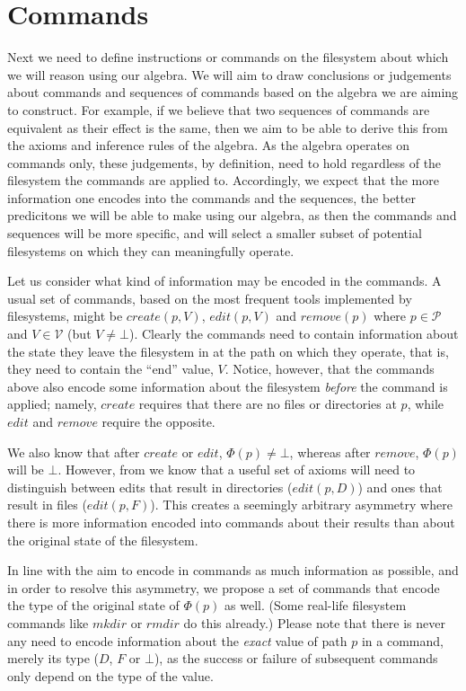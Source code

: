 \documentclass[12pt]{article}
\newcommand{\setv}{\mathcal{V}}
\newcommand{\setp}{\mathcal{P}}
\newcommand{\empt}{\bot}
\newcommand{\FS}{\Phi} %
\begin{document}
\section{Commands}

Next we need to define instructions or commands on the filesystem about which we will reason
using our algebra.
We will aim to draw conclusions or judgements about commands and sequences of commands
based on the algebra we are aiming to construct.
For example, if we believe that two sequences of commands are equivalent as their effect
is the same, then we aim to be able to derive this from the axioms and inference rules of the
algebra.
As the algebra operates on commands only,
these judgements, by definition, need to hold regardless of the filesystem the commands are applied to.
Accordingly, we expect that the more information one encodes into the commands and the sequences,
the better predicitons we will be able to make using our algebra,
as then the commands and sequences will be more specific, and will select a smaller subset
of potential filesystems on which they can meaningfully operate.

Let us consider what kind of information may be encoded in the commands.
A usual set of commands, based on the most frequent tools implemented by filesystems,
might be $create(p,V)$, $edit(p,V)$ and $remove(p)$ where $p\in\setp$ and $V\in\setv$ (but $V\neq\empt$).
Clearly the commands need to contain information about the state they leave the filesystem
in at the path on which they operate, that is, they need to contain the ``end'' value, $V$.
Notice, however, that the commands above also encode some information about the filesystem
{\it before} the command is applied; namely, $create$ requires that there are no files
or directories at $p$, while $edit$ and $remove$ require the opposite.

We also know that after $create$ or $edit$, $\FS(p)\neq\empt$, whereas after $remove$,
$\FS(p)$ will be $\empt$. However, from \cite{NREC:alg} we know that a useful set of axioms
will need to distinguish between edits that result in directories ($edit(p,D)$) and
ones that result in files ($edit(p,F)$). This creates a seemingly arbitrary asymmetry where
there is more information encoded into commands about their results than about the
original state of the filesystem.

In line with the aim to encode in commands as much information as possible,
and in order to resolve this asymmetry, we propose a set of commands that encode
the type of the original state of $\FS(p)$ as well.
(Some real-life filesystem commands like $mkdir$ or $rmdir$ do this already.)
Please note that there is never any need to encode information about the
{\it exact} value of path $p$ in a command, merely its type ($D$, $F$ or $\empt$),
as the success or failure of subsequent commands only depend on the type of the value.
\end{document}

